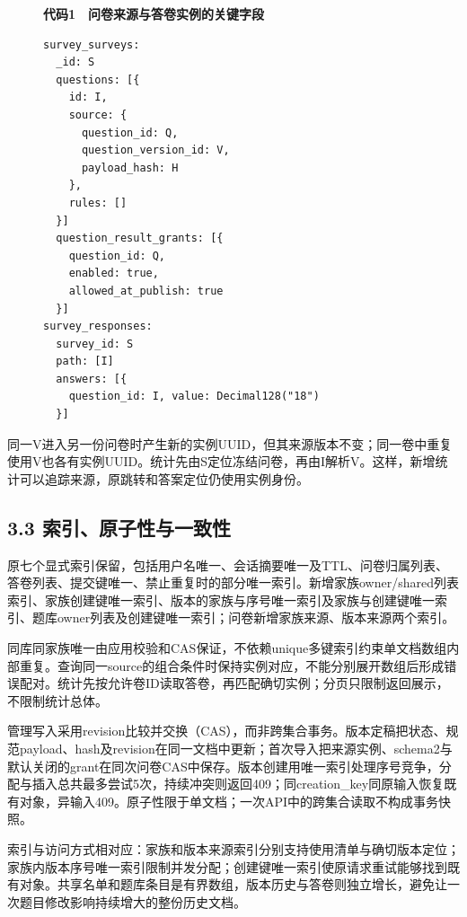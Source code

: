 \begin{figure}[t]
\centering\begin{minipage}{\linewidth}
\small\textbf{代码1　问卷来源与答卷实例的关键字段}\par\smallskip
\begin{Verbatim}[fontsize=\footnotesize,breaklines=true,breakanywhere=true,frame=single,framesep=5pt,rulecolor=\color{linkblue!45}]
survey_surveys:
  _id: S
  questions: [{
    id: I,
    source: {
      question_id: Q,
      question_version_id: V,
      payload_hash: H
    },
    rules: []
  }]
  question_result_grants: [{
    question_id: Q,
    enabled: true,
    allowed_at_publish: true
  }]
survey_responses:
  survey_id: S
  path: [I]
  answers: [{
    question_id: I, value: Decimal128("18")
  }]
\end{Verbatim}
\end{minipage}\end{figure}

同一V进入另一份问卷时产生新的实例UUID，但其来源版本不变；同一卷中重复使用V也各有实例UUID。统计先由S定位冻结问卷，再由I解析V。这样，新增统计可以追踪来源，原跳转和答案定位仍使用实例身份。

\subsection{3.3 索引、原子性与一致性}\label{ux7d22ux5f15ux539fux5b50ux6027ux4e0eux4e00ux81f4ux6027}

原七个显式索引保留，包括用户名唯一、会话摘要唯一及TTL、问卷归属列表、答卷列表、提交键唯一、禁止重复时的部分唯一索引。新增家族owner/shared列表索引、家族创建键唯一索引、版本的家族与序号唯一索引及家族与创建键唯一索引、题库owner列表及创建键唯一索引；问卷新增家族来源、版本来源两个索引。

同库同家族唯一由应用校验和CAS保证，不依赖unique多键索引约束单文档数组内部重复。查询同一source的组合条件时保持实例对应，不能分别展开数组后形成错误配对。统计先按允许卷ID读取答卷，再匹配确切实例；分页只限制返回展示，不限制统计总体。

管理写入采用revision比较并交换（CAS），而非跨集合事务。版本定稿把状态、规范payload、hash及revision在同一文档中更新；首次导入把来源实例、schema2与默认关闭的grant在同次问卷CAS中保存。版本创建用唯一索引处理序号竞争，分配与插入总共最多尝试5次，持续冲突则返回409；同creation\_key同原输入恢复既有对象，异输入409。原子性限于单文档；一次API中的跨集合读取不构成事务快照。

索引与访问方式相对应：家族和版本来源索引分别支持使用清单与确切版本定位；家族内版本序号唯一索引限制并发分配；创建键唯一索引使原请求重试能够找到既有对象。共享名单和题库条目是有界数组，版本历史与答卷则独立增长，避免让一次题目修改影响持续增大的整份历史文档。

